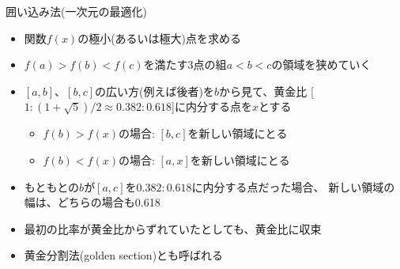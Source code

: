 \begin{frame}[t,fragile]{囲い込み法(一次元の最適化)}
  \begin{itemize}
  \item 関数$f(x)$の極小(あるいは極大)点を求める
  \item $f(a) > f(b) < f(c)$を満たす3点の組$a < b < c$の領域を狭めていく
  \item $[a,b]$、$[b,c]$の広い方(例えば後者)を$b$から見て、黄金比
    [$1:(1+\sqrt{5})/2 \approx 0.382:0.618$]に内分する点を$x$とする
    \begin{itemize}
    \item $f(b) > f(x)$の場合: $[b,c]$を新しい領域にとる
    \item $f(b) < f(x)$の場合: $[a,x]$を新しい領域にとる
    \end{itemize}
  \item もともとの$b$が$[a,c]$を$0.382:0.618$に内分する点だった場合、
    新しい領域の幅は、どちらの場合も0.618
  \item 最初の比率が黄金比からずれていたとしても、黄金比に収束
  \item 黄金分割法(golden section)とも呼ばれる
  \end{itemize}
\end{frame}
